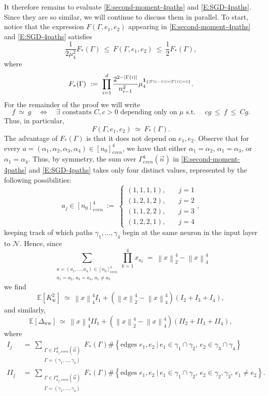 \documentclass[11pt, reqno]{amsart}
\newcommand{\E}[1]{{\mathbb E}\left [#1\right]}
\newcommand{\abs}[1]{\ensuremath{\left| #1 \right|}}
\newcommand{\lr}[1]{\ensuremath{\left(#1 \right)}}
\newcommand{\norm}[1]{\left\lVert#1\right\rVert}
\newcommand{\set}[1]{\ensuremath{\{#1\}}}
\newcommand{\mN}{\mathcal N}
\newcommand{\Kw}{K_{\mathrm{w}}}
\newcommand{\Dww}{\Delta_{\mathrm{ww}}}
\begin{document}
It therefore remains to evaluate \eqref{E:second-moment-4paths} and \eqref{E:SGD-4paths}. Since they are so similar, we will continue to discuss them in parallel. To start, notice that the expression $F(\Gamma, e_1,e_2)$ appearing in \eqref{E:second-moment-4paths} and \eqref{E:SGD-4paths} satisfies
\[\frac{1}{2\mu_4^2}F_*(\Gamma)~\leq ~ F(\Gamma,e_1,e_2)~\leq ~\frac{1}{2}F_*(\Gamma),\]
where
\begin{align}\label{E:F-star-def}
  F_*(\Gamma)~:=~\prod_{i=1}^d \frac{2^{2-\abs{\Gamma(i)}}}{n_{i-1}^2}\mu_4^{{\bf 1}_{\set{\abs{\Gamma(i-1)}=\abs{\Gamma(i)}=1}}}.
\end{align}
For the remainder of the proof we will write
\[f~\simeq~g\quad \Longleftrightarrow \quad \exists \text{ constants }C,c>0\text{ depending only on }\mu\text{ s.t. }\quad cg~\leq ~f~\leq~Cg.\]
Thus, in particular, 
\[F(\Gamma,e_1,e_2)~\simeq~ F_*(\Gamma).\]
The advantage of $F_*(\Gamma)$ is that it does not depend on $e_1,e_2.$ Observe that for every $a=(\alpha_1,\alpha_2,\alpha_3,\alpha_4)\in [n_0]_{even}^4$, we have that either $\alpha_1=\alpha_2$, $\alpha_1=\alpha_3$, or $\alpha_1=\alpha_4$. Thus, by symmetry, the sum over $\Gamma_{even}^4(\vec{n})$ in \eqref{E:second-moment-4paths} and \eqref{E:SGD-4paths} takes only four distinct values, represented by the following possibilities:
\[a_j\in [n_0]_{even}^4~:=~
 \begin{cases}
   (1,1,1,1),&\quad j=1\\
   (1,2,1,2),&\quad j=2\\
   (1,1,2,2),&\quad j=3\\
   (1,2,2,1),&\quad j=4
 \end{cases},\]
keeping track of which paths $\gamma_1,\ldots, \gamma_4$ begin at the same neuron in the input layer to $\mN.$ Hence, since
\[\sum_{\substack{a=(a_1,\ldots, a_4)\in [n_0]_{even}^4\\ a_1=a_2,\, a_3=a_4,\, a_1\neq a_3}}\prod_{k=1}^4x_{a_k}~=~\norm{x}_2^4-\norm{x}_4^4 \]
we find
\begin{equation}\label{E:K-I}
\E{\Kw^2}~\simeq~\norm{x}_4^4 I_{1}+(\norm{x}_2^4-\norm{x}_4^4)(I_{2}+I_{3}+I_{4}),
\end{equation}
and similarly, 
\begin{equation}\label{E:Delta-K-I}
\E{ \Dww}~\simeq~\norm{x}_4^4 II_{1}+(\norm{x}_2^4-\norm{x}_4^4)(II_{2}+II_{3}+II_{4}),
\end{equation}
where
\begin{align}
\label{E:I-def}  I_{j}~&=~\sum_{\substack{\Gamma\in \Gamma_{a_j, even}^4\lr{\vec{n}}\\\Gamma=\lr{\gamma_1,\ldots, \gamma_4}}} F_*(\Gamma) \#\left\{\text{edges }e_1,e_2~|~e_1\in \gamma_1\cap \gamma_2,\,e_2\in \gamma_3\cap \gamma_4\right\}\\
\label{E:II-def}  II_{j}~&=~\sum_{\substack{\Gamma\in \Gamma_{a_j, even}^4\lr{\vec{n}}\\\Gamma=\lr{\gamma_1,\ldots, \gamma_4}}} F_*(\Gamma) \#\left\{\text{edges }e_1,e_2~|~e_1\in \gamma_1\cap \gamma_2,\,e_2\in \gamma_2, \gamma_3,\, e_1\neq e_2\right\}.
\end{align}
\end{document}
